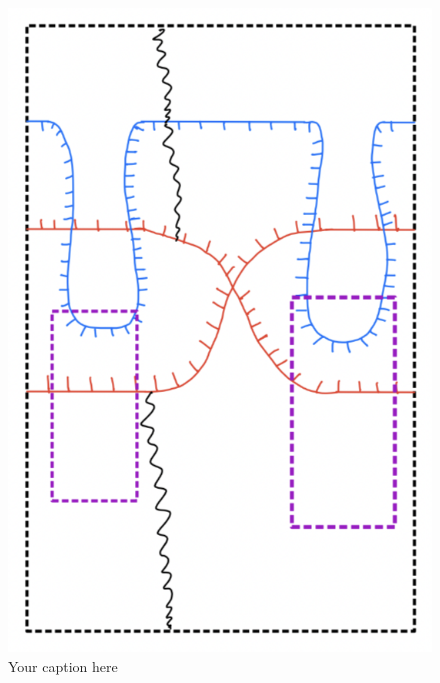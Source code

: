 \begin{figure}[H] %
    \centering
    \includegraphics[scale = 0.95]{diagrams/lemma10/5.png} %
    \caption{Your caption here}
    \label{fig:your-label}
\end{figure}

